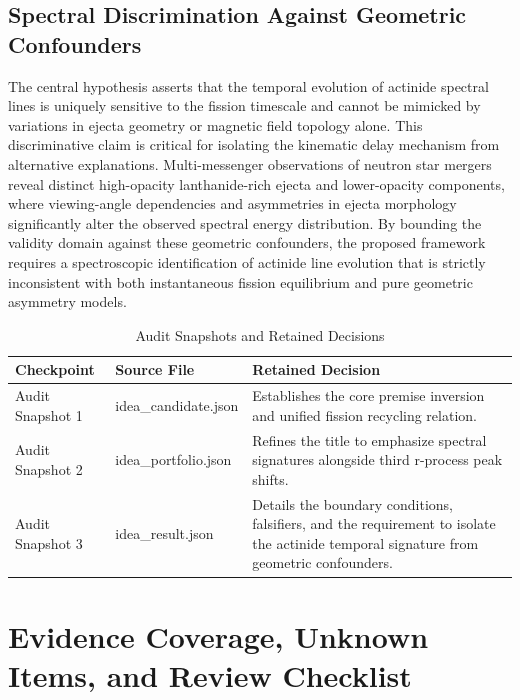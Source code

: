 \documentclass[conference]{IEEEtran}
\begin{document}
\subsection{Spectral Discrimination Against Geometric Confounders}
The central hypothesis asserts that the temporal evolution of actinide spectral lines is uniquely sensitive to the fission timescale and cannot be mimicked by variations in ejecta geometry or magnetic field topology alone. This discriminative claim is critical for isolating the kinematic delay mechanism from alternative explanations. Multi-messenger observations of neutron star mergers reveal distinct high-opacity lanthanide-rich ejecta and lower-opacity components, where viewing-angle dependencies and asymmetries in ejecta morphology significantly alter the observed spectral energy distribution. By bounding the validity domain against these geometric confounders, the proposed framework requires a spectroscopic identification of actinide line evolution that is strictly inconsistent with both instantaneous fission equilibrium and pure geometric asymmetry models.~\cite{cite_07d6df5d6978a1fc,cite_43194f3b6113c2ab,cite_612290131318c0d4}

\begin{table}[htbp]
\centering
\footnotesize
\setlength{\tabcolsep}{3pt}
\renewcommand{\arraystretch}{1.12}
\caption{Audit Snapshots and Retained Decisions}
\label{tab:appendix-idea-evolution-b3}
\begin{tabular}{|p{}|p{}|p{}|}
\hline
Checkpoint & Source File & Retained Decision \\\hline
Audit Snapshot 1 & idea\_candidate.json & Establishes the core premise inversion and unified fission recycling relation. \\\hline
Audit Snapshot 2 & idea\_portfolio.json & Refines the title to emphasize spectral signatures alongside third r-process peak shifts. \\\hline
Audit Snapshot 3 & idea\_result.json & Details the boundary conditions, falsifiers, and the requirement to isolate the actinide temporal signature from geometric confounders. \\\hline
\end{tabular}
\end{table}

\section{Evidence Coverage, Unknown Items, and Review Checklist}
\end{document}
